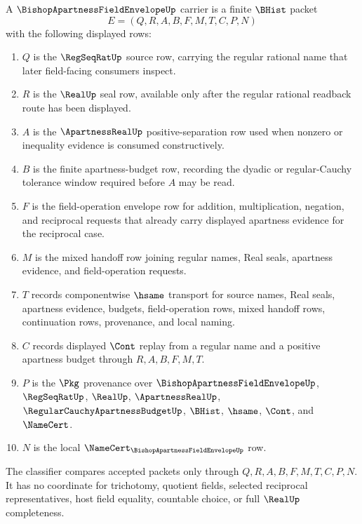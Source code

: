 \begin{definition}\label{def:bishop-apartness-field-envelope-carrier}
A $\BishopApartnessFieldEnvelopeUp$ carrier is a finite $\BHist$ packet
$$
E=(Q,R,A,B,F,M,T,C,P,N)
$$
with the following displayed rows:
\begin{enumerate}
\item $Q$ is the $\RegSeqRatUp$ source row, carrying the regular rational name that later field-facing consumers inspect.
\item $R$ is the $\RealUp$ seal row, available only after the regular rational readback route has been displayed.
\item $A$ is the $\ApartnessRealUp$ positive-separation row used when nonzero or inequality evidence is consumed constructively.
\item $B$ is the finite apartness-budget row, recording the dyadic or regular-Cauchy tolerance window required before $A$ may be read.
\item $F$ is the field-operation envelope row for addition, multiplication, negation, and reciprocal requests that already carry displayed apartness evidence for the reciprocal case.
\item $M$ is the mixed handoff row joining regular names, Real seals, apartness evidence, and field-operation requests.
\item $T$ records componentwise $\hsame$ transport for source names, Real seals, apartness evidence, budgets, field-operation rows, mixed handoff rows, continuation rows, provenance, and local naming.
\item $C$ records displayed $\Cont$ replay from a regular name and a positive apartness budget through $R,A,B,F,M,T$.
\item $P$ is the $\Pkg$ provenance over $\BishopApartnessFieldEnvelopeUp$, $\RegSeqRatUp$, $\RealUp$, $\ApartnessRealUp$, $\RegularCauchyApartnessBudgetUp$, $\BHist$, $\hsame$, $\Cont$, and $\NameCert$.
\item $N$ is the local $\NameCert_{\BishopApartnessFieldEnvelopeUp}$ row.
\end{enumerate}
The classifier compares accepted packets only through $Q,R,A,B,F,M,T,C,P,N$. It has no coordinate for trichotomy, quotient fields, selected reciprocal representatives, host field equality, countable choice, or full $\RealUp$ completeness.
\end{definition}

